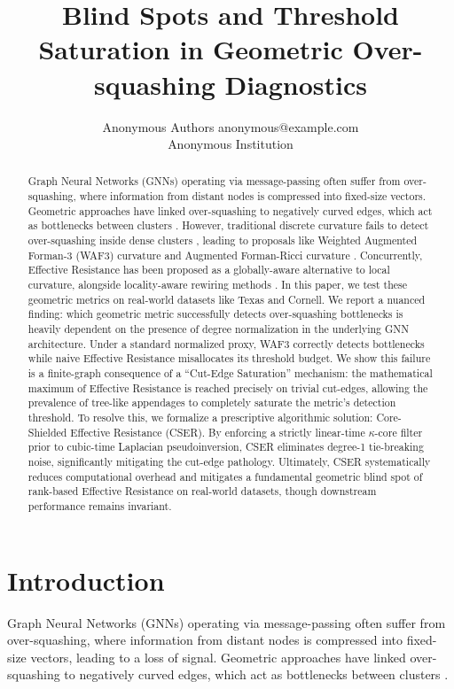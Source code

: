 \documentclass[10pt]{article} %
\title{Blind Spots and Threshold Saturation in Geometric Over-squashing Diagnostics}
\author{\name Anonymous Authors \email anonymous@example.com \\
      \addr Anonymous Institution}
\begin{document}
\maketitle

\begin{abstract}
Graph Neural Networks (GNNs) operating via message-passing often suffer from over-squashing, where information from distant nodes is compressed into fixed-size vectors. Geometric approaches have linked over-squashing to negatively curved edges, which act as bottlenecks between clusters \citep{Topping2022}. However, traditional discrete curvature fails to detect over-squashing inside dense clusters \citep{Chen2026}, leading to proposals like Weighted Augmented Forman-3 (WAF3) curvature and Augmented Forman-Ricci curvature \citep{Fesser2023}. Concurrently, Effective Resistance \citep{Black2023} has been proposed as a globally-aware alternative to local curvature, alongside locality-aware rewiring methods \citep{Barbero2024}. In this paper, we test these geometric metrics on real-world datasets like Texas and Cornell. We report a nuanced finding: which geometric metric successfully detects over-squashing bottlenecks is heavily dependent on the presence of degree normalization in the underlying GNN architecture. Under a standard normalized proxy, WAF3 correctly detects bottlenecks while naive Effective Resistance misallocates its threshold budget. We show this failure is a finite-graph consequence of a ``Cut-Edge Saturation'' mechanism: the mathematical maximum of Effective Resistance is reached precisely on trivial cut-edges, allowing the prevalence of tree-like appendages to completely saturate the metric's detection threshold. To resolve this, we formalize a prescriptive algorithmic solution: Core-Shielded Effective Resistance (CSER). By enforcing a strictly linear-time $\kappa$-core filter prior to cubic-time Laplacian pseudoinversion, CSER eliminates degree-1 tie-breaking noise, significantly mitigating the cut-edge pathology. Ultimately, CSER systematically reduces computational overhead and mitigates a fundamental geometric blind spot of rank-based Effective Resistance on real-world datasets, though downstream performance remains invariant.
\end{abstract}

\section{Introduction}
Graph Neural Networks (GNNs) operating via message-passing often suffer from over-squashing, where information from distant nodes is compressed into fixed-size vectors, leading to a loss of signal. Geometric approaches have linked over-squashing to negatively curved edges, which act as bottlenecks between clusters \citep{Topping2022}.
\end{document}

